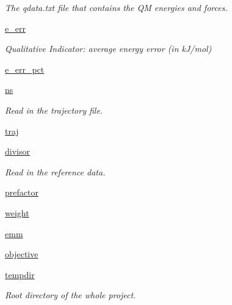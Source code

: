 \begin{DoxyCompactItemize}
\begin{DoxyCompactList}\small\item\em The qdata.\-txt file that contains the Q\-M energies and forces. \end{DoxyCompactList}\item 
\hyperlink{classforcebalance_1_1interaction_1_1Interaction_a1577e34cd7031365ade75a2a56ec9b0d}{e\-\_\-err}
\begin{DoxyCompactList}\small\item\em Qualitative Indicator\-: average energy error (in k\-J/mol) \end{DoxyCompactList}\item 
\hyperlink{classforcebalance_1_1interaction_1_1Interaction_ae66b1b95cac5307950ae787b5409200b}{e\-\_\-err\-\_\-pct}
\item 
\hyperlink{classforcebalance_1_1interaction_1_1Interaction_af8eea2643c465ee51732bff35b4b9bc8}{ns}
\begin{DoxyCompactList}\small\item\em Read in the trajectory file. \end{DoxyCompactList}\item 
\hyperlink{classforcebalance_1_1interaction_1_1Interaction_af838808df9bf58ead305d079ccf21f8a}{traj}
\item 
\hyperlink{classforcebalance_1_1interaction_1_1Interaction_a57f25d35d31643d5467fd32579f64030}{divisor}
\begin{DoxyCompactList}\small\item\em Read in the reference data. \end{DoxyCompactList}\item 
\hyperlink{classforcebalance_1_1interaction_1_1Interaction_ad4e78437713a0b9b809e4ba52cbbf9d2}{prefactor}
\item 
\hyperlink{classforcebalance_1_1interaction_1_1Interaction_a68a6e43e48ec75f375fb987e177126a9}{weight}
\item 
\hyperlink{classforcebalance_1_1interaction_1_1Interaction_a2b97abefbf9d9f2b061b9da3b9d0bb30}{emm}
\item 
\hyperlink{classforcebalance_1_1interaction_1_1Interaction_ad25168cac2752545c55fc7e9206d9d29}{objective}
\item 
\hyperlink{classforcebalance_1_1target_1_1Target_aa1f01b5b78db253b5b66384ed11ed193}{tempdir}
\begin{DoxyCompactList}\small\item\em Root directory of the whole project. \end{DoxyCompactList}\item 

\end{DoxyCompactItemize}
